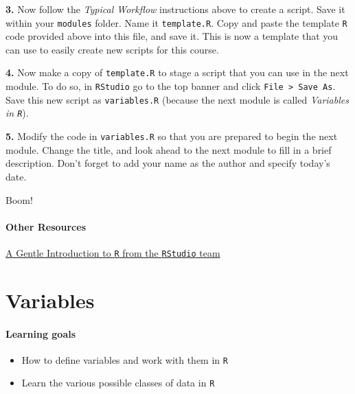 \documentclass[]{book}
\providecommand{\tightlist}{%
  \setlength{\itemsep}{0pt}\setlength{\parskip}{0pt}}
\begin{document}
\textbf{3.} Now follow the \emph{Typical Workflow} instructions above to create a script. Save it within your \texttt{modules} folder. Name it \texttt{template.R}. Copy and paste the template \texttt{R} code provided above into this file, and save it. This is now a template that you can use to easily create new scripts for this course.

\textbf{4.} Now make a copy of \texttt{template.R} to stage a script that you can use in the next module. To do so, in \texttt{RStudio} go to the top banner and click \texttt{File\ \textgreater{}\ Save\ As}. Save this new script as \texttt{variables.R} (because the next module is called \emph{Variables in \texttt{R}}).

\textbf{5.} Modify the code in \texttt{variables.R} so that you are prepared to begin the next module. Change the title, and look ahead to the next module to fill in a brief description. Don't forget to add your name as the author and specify today's date.

Boom!

\hypertarget{other-resources-1}{%
\subsubsection*{Other Resources}\label{other-resources-1}}

\href{https://www.rstudio.com/resources/webinars/a-gentle-introduction-to-tidy-statistics-in-r/}{A Gentle Introduction to \texttt{R} from the \texttt{RStudio} team}

\hypertarget{variables}{%
\chapter{Variables}\label{variables}}

\hypertarget{learning-goals-2}{%
\subsubsection*{Learning goals}\label{learning-goals-2}}

\begin{itemize}
\tightlist
\item
  How to define variables and work with them in \texttt{R}\\
\item
  Learn the various possible classes of data in \texttt{R}
\end{itemize}
\end{document}
